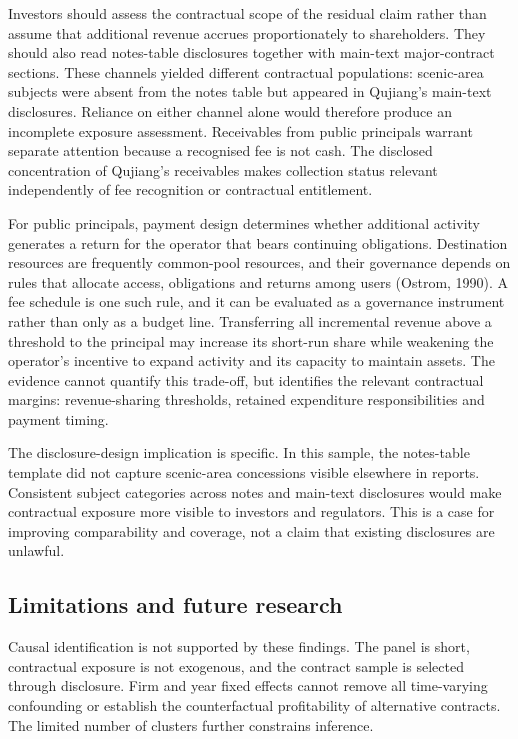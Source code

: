 \documentclass[review,3p,times]{elsarticle}
\begin{document}
Investors should assess the contractual scope of the residual claim rather than assume that additional revenue accrues proportionately to shareholders. They should also read notes-table disclosures together with main-text major-contract sections. These channels yielded different contractual populations: scenic-area subjects were absent from the notes table but appeared in Qujiang's main-text disclosures. Reliance on either channel alone would therefore produce an incomplete exposure assessment. Receivables from public principals warrant separate attention because a recognised fee is not cash. The disclosed concentration of Qujiang's receivables makes collection status relevant independently of fee recognition or contractual entitlement.

For public principals, payment design determines whether additional activity generates a return for the operator that bears continuing obligations. Destination resources are frequently common-pool resources, and their governance depends on rules that allocate access, obligations and returns among users (Ostrom, 1990). A fee schedule is one such rule, and it can be evaluated as a governance instrument rather than only as a budget line. Transferring all incremental revenue above a threshold to the principal may increase its short-run share while weakening the operator's incentive to expand activity and its capacity to maintain assets. The evidence cannot quantify this trade-off, but identifies the relevant contractual margins: revenue-sharing thresholds, retained expenditure responsibilities and payment timing.

The disclosure-design implication is specific. In this sample, the notes-table template did not capture scenic-area concessions visible elsewhere in reports. Consistent subject categories across notes and main-text disclosures would make contractual exposure more visible to investors and regulators. This is a case for improving comparability and coverage, not a claim that existing disclosures are unlawful.

\subsection{Limitations and future research}

Causal identification is not supported by these findings. The panel is short, contractual exposure is not exogenous, and the contract sample is selected through disclosure. Firm and year fixed effects cannot remove all time-varying confounding or establish the counterfactual profitability of alternative contracts. The limited number of clusters further constrains inference.
\end{document}
